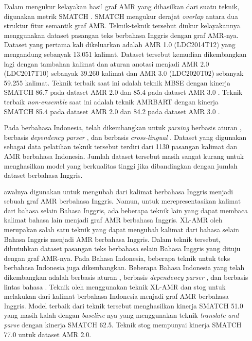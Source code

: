 Dalam mengukur kelayakan hasil graf \gls{AMR} yang dihasilkan dari suatu teknik, digunakan metrik \gls{SMATCH} .
SMATCH mengukur derajat \textit{overlap} antara dua struktur fitur semantik graf \gls{AMR}.
Teknik-teknik \amrparsing{} tersebut diukur kelayakannya menggunakan dataset pasangan teks berbahasa Inggris dengan graf AMR-nya.
Dataset yang pertama kali dikeluarkan adalah AMR 1.0 (LDC2014T12) yang mengandung sebanyak 13.051 kalimat.
Dataset tersebut kemudian dikembangkan lagi dengan tambahan kalimat dan aturan anotasi menjadi AMR 2.0 (LDC2017T10) sebanyak 39.260 kalimat dan AMR 3.0 (LDC2020T02) sebanyak 59.255 kalimat.
Teknik \amrparsing{} terbaik saat ini adalah teknik MBSE dengan kinerja SMATCH 86.7 pada dataset \gls{AMR} 2.0 dan 85.4 pada dataset \gls{AMR} 3.0 .
Teknik \amrparsing{} terbaik \textit{non-ensemble} saat ini adalah teknik AMRBART dengan kinerja SMATCH 85.4 pada dataset \gls{AMR} 2.0 dan 84.2 pada dataset \gls{AMR} 3.0 .


Pada \amrparsing{} berbahasa Indonesia, telah dikembangkan untuk \textit{parsing} berbasis aturan , berbasis \textit{dependency parser} , dan berbasis \textit{cross-lingual} .
Dataset yang digunakan sebagai data pelatihan teknik tersebut terdiri dari 1130 pasangan kalimat dan AMR berbahasa Indonesia.
Jumlah dataset tersebut masih sangat kurang untuk menghasilkan model yang berkualitas tinggi jika dibandingkan dengan jumlah dataset berbahasa Inggris.

\amrparsing{} awalnya digunakan untuk mengubah dari kalimat berbahasa Inggris menjadi sebuah graf \gls{AMR} berbahasa Inggris.
Namun, untuk merepresentasikan kalimat dari bahasa selain Bahasa Inggris, ada beberapa teknik lain yang dapat membaca kalimat bahasa lain menjadi graf \gls{AMR} berbahasa Inggris.
\gls{XL-AMR} oleh \textcite{blloshmi2020} merupakan salah satu teknik yang dapat mengubah kalimat dari bahasa selain Bahasa Inggris menjadi \gls{AMR} berbahasa Inggris.
Dalam teknik tersebut, dibutuhkan dataset pasangan teks berbahasa selain Bahasa Inggris yang dituju dengan graf \gls{AMR}-nya.
Pada Bahasa Indonesia, beberapa teknik \amrparsing{} untuk teks berbahasa Indonesia juga dikembangkan.
Beberapa \amrparsing{} Bahasa Indonesia yang telah dikembangkan adalah \amrparsing{} berbasis aturan , berbasis \textit{dependency parser} , dan berbasis lintas bahasa .
Teknik \amrparsing{} oleh \textcite{putra2022} menggunakan teknik \gls{XL-AMR} dan stog untuk melakukan \amrparsing{} dari kalimat berbahasa Indonesia menjadi graf \gls{AMR} berbahasa Inggris.
Model terbaik dari teknik tersebut menghasilkan kinerja SMATCH 51.0 yang masih kalah dengan \textit{baseline}-nya yang menggunakan teknik \textit{translate-and-parse} dengan kinerja SMATCH 62.5.
Teknik \amrparsing{} stog mempunyai kinerja SMATCH 77.0 untuk dataset \gls{AMR} 2.0.

